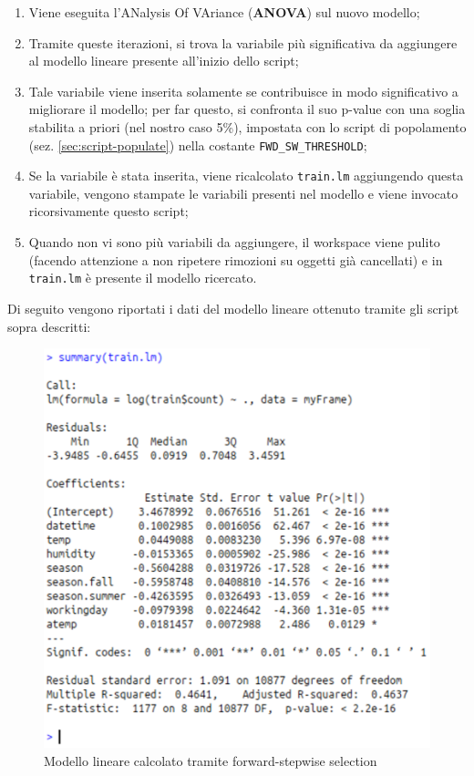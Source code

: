 \begin{itemize}
\begin{enumerate}
  \item Viene eseguita l'ANalysis Of VAriance (\textbf{ANOVA}) sul nuovo
    modello;
  \item Tramite queste iterazioni, si trova la variabile più significativa da
    aggiungere al modello lineare presente all'inizio dello script;
  \item Tale variabile viene inserita solamente se contribuisce in modo
      significativo a migliorare il modello; per far questo, si confronta il
      suo p-value con una soglia stabilita a priori (nel nostro caso 5\%),
      impostata con lo script di popolamento (sez. \ref{sec:script-populate})
      nella costante \texttt{FWD\_SW\_THRESHOLD};
    \item Se la variabile è stata inserita, viene ricalcolato \texttt{train.lm}
      aggiungendo questa variabile, vengono stampate le variabili presenti nel
      modello e viene invocato ricorsivamente questo script;
    \item Quando non vi sono più variabili da aggiungere, il workspace viene
      pulito (facendo attenzione a non ripetere rimozioni su oggetti già
      cancellati) e in \texttt{train.lm} è presente il modello ricercato.
  \end{enumerate}
\end{itemize}

Di seguito vengono riportati i dati del modello lineare ottenuto tramite gli
script sopra descritti:

\begin{figure}[H]
  \centering
  \includegraphics[width=.55\columnwidth]{images/lm-after-fwd-steps.eps}
  \caption{Modello lineare calcolato tramite forward-stepwise selection}
    \label{fig:simpl-lm-log-qqplot}
\end{figure}
